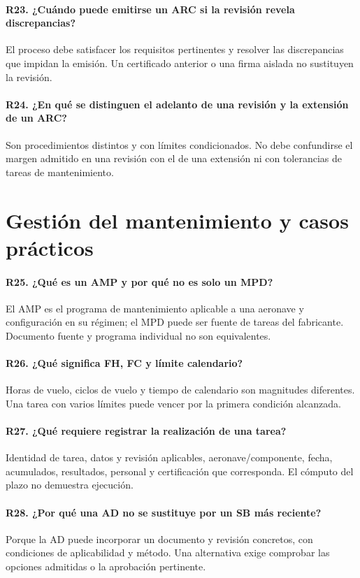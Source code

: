 \paragraph{R23. ¿Cuándo puede emitirse un ARC si la revisión revela discrepancias?} El proceso debe satisfacer los requisitos pertinentes y resolver las discrepancias que impidan la emisión. Un certificado anterior o una firma aislada no sustituyen la revisión.

\paragraph{R24. ¿En qué se distinguen el adelanto de una revisión y la extensión de un ARC?} Son procedimientos distintos y con límites condicionados. No debe confundirse el margen admitido en una revisión con el de una extensión ni con tolerancias de tareas de mantenimiento.

\section{Gestión del mantenimiento y casos prácticos}

\paragraph{R25. ¿Qué es un AMP y por qué no es solo un MPD?} El AMP es el programa de mantenimiento aplicable a una aeronave y configuración en su régimen; el MPD puede ser fuente de tareas del fabricante. Documento fuente y programa individual no son equivalentes.

\paragraph{R26. ¿Qué significa FH, FC y límite calendario?} Horas de vuelo, ciclos de vuelo y tiempo de calendario son magnitudes diferentes. Una tarea con varios límites puede vencer por la primera condición alcanzada.

\paragraph{R27. ¿Qué requiere registrar la realización de una tarea?} Identidad de tarea, datos y revisión aplicables, aeronave/componente, fecha, acumulados, resultados, personal y certificación que corresponda. El cómputo del plazo no demuestra ejecución.

\paragraph{R28. ¿Por qué una AD no se sustituye por un SB más reciente?} Porque la AD puede incorporar un documento y revisión concretos, con condiciones de aplicabilidad y método. Una alternativa exige comprobar las opciones admitidas o la aprobación pertinente.

